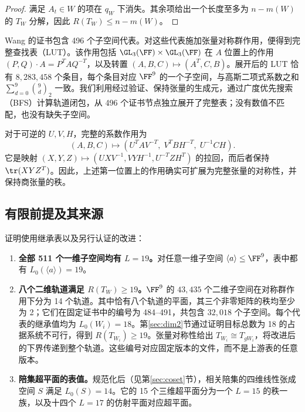 \documentclass[11pt,a4paper]{article}
\begin{document}
\begin{proof}
  满足 $A_t\in W$ 的项在 $q_W$ 下消失。其余项给出一个长度至多为 $n-m(W)$ 的 $T_W$ 分解，因此 $R(T_W)\le n-m(W)$。
\end{proof}

Wang 的证书包含 496 个子空间代表。对这些代表施加张量对称群作用，便得到完整查找表（LUT）。该作用包括 $\GL_3(\FF)\times\GL_3(\FF)$ 在 $A$ 位置上的作用 $(P,Q)\cdot A=P^TAQ^{-T}$，以及转置 $(A,B,C)\mapsto(A^T,C,B)$。展开后的 LUT 恰有 $8{,}283{,}458$ 个条目，每个条目对应 $\FF^9$ 的一个子空间，与高斯二项式系数之和 $\sum_{d=0}^9\binom{9}{d}_2$ 一致。我们利用经过验证、保持张量的生成元，通过广度优先搜索（BFS）计算轨道闭包，从 496 个证书节点独立展开了完整表；没有数值不匹配，也没有缺失子空间。

对于可逆的 $U,V,H$，完整的系数作用为
\begin{equation}\label{eq:coefficient-action}
 (A,B,C)\longmapsto
 (U^TAV^{-T},\;V^TBH^{-T},\;U^{-1}CH).
\end{equation}
它是映射 $(X,Y,Z)\mapsto(UXV^{-1},VYH^{-1},U^{-T}ZH^T)$ 的拉回，而后者保持 $\tr(XYZ^T)$。因此，上述第一位置上的作用确实可扩展为完整张量的对称性，并保持商张量的秩。

\subsection{有限前提及其来源}

证明使用继承表以及另行认证的改进：
\begin{enumerate}[label=(\roman*)]
  \item\label{it:lines} \textbf{全部 511 个一维子空间均有 $L=19$。}\quad 对任意一维子空间 $\langle a\rangle\le\FF^9$，表中都有 $L_0(\langle a\rangle)=19$。
  \item\label{it:dim2} \textbf{八个二维轨道满足 $R(T_W)\ge19$。}\quad $\FF^9$ 的 $43{,}435$ 个二维子空间在对称群作用下分为 14 个轨道。其中恰有八个轨道的平面，其三个非零矩阵的秩均至少为 2；它们在固定证书中的编号为 484--491，共包含 $32{,}018$ 个子空间。每个代表的继承值均为 $L_0(W_i)=18$。第\ref{sec:dim2}节通过证明目标总数为 18 的占据系统不可行，得到 $R(T_{W_i})\ge19$。张量对称性给出 $T_{W_i}\cong T_{gW_i}$，将改进后的下界传递到整个轨道。这些编号对应固定版本的文件，而不是上游表的任意版本。
  \item\label{it:coset} \textbf{陪集超平面的表值。}\quad 规范化后（见第\ref{sec:coset}节），相关陪集的四维线性张成空间 $S$ 满足 $L_0(S)=14$。它的 15 个三维超平面分为一个 $L=15$ 的秩一族，以及十四个 $L=17$ 的仿射平面对应超平面。
\end{enumerate}
\end{document}
